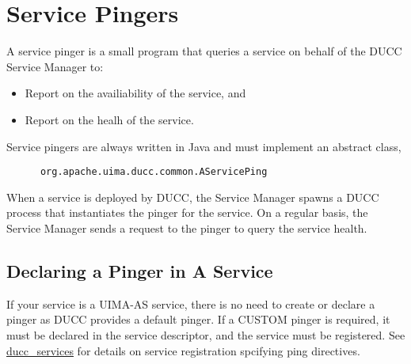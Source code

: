           
      \section{Service Pingers}
      \label{sec:service.pingers}
      A service pinger is a small program that queries a service on behalf of the
      DUCC Service Manager to:
      \begin{itemize}
        \item Report on the availiability of the service, and
        \item Report on the healh of the service.
      \end{itemize}
      
      Service pingers are always written in Java and must implement an abstract class,
\begin{verbatim}
      org.apache.uima.ducc.common.AServicePing
\end{verbatim}
      When a service is deployed by
      DUCC, the Service Manager spawns a DUCC process that instantiates the pinger for
      the service.  On a regular basis, the Service Manager sends a request to the pinger
      to query the service health.

      \subsection{Declaring a Pinger in A Service}

      If your service is a UIMA-AS service, there is no need to create or declare a pinger as  DUCC
      provides a default pinger.  If a CUSTOM pinger is required, it must be declared in the service
      descriptor, and the service must be registered.  See
      \hyperref[sec:cli.ducc-services]{ducc\_services} for details on service registration spcifying
      ping directives.

